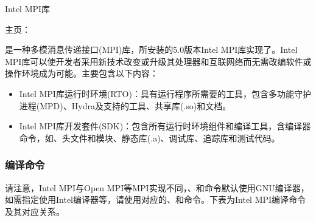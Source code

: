 \documentclass[a4paper,12pt,english]{sphinxmanual}
\begin{document}
\sphinxAtStartPar
Intel MPI库 %
\begin{footnote}[4]\sphinxAtStartFootnote
主页：
%
\end{footnote} 是一种多模消息传递接口(MPI)库，所安装的5.0版本Intel MPI库实现了。Intel MPI库可以使开发者采用新技术改变或升级其处理器和互联网络而无需改编软件或操作环境成为可能。主要包含以下内容：
\begin{itemize}
\item {} 
\sphinxAtStartPar
Intel
MPI库运行时环境(RTO)：具有运行程序所需要的工具，包含多功能守护进程(MPD)、Hydra及支持的工具、共享库(.so)和文档。

\item {} 
\sphinxAtStartPar
Intel
MPI库开发套件(SDK)：包含所有运行时环境组件和编译工具，含编译器命令，如、头文件和模块、静态库(.a)、调试库、追踪库和测试代码。

\end{itemize}


\subsubsection{编译命令}
\label{\detokenize{mpi-application/mpi-application:id8}}
\sphinxAtStartPar
请注意，Intel MPI与Open MPI等MPI实现不同，、和命令默认使用GNU编译器，如需指定使用Intel编译器等，请使用对应的、和命令。下表为Intel MPI编译命令及其对应关系。
\end{document}
